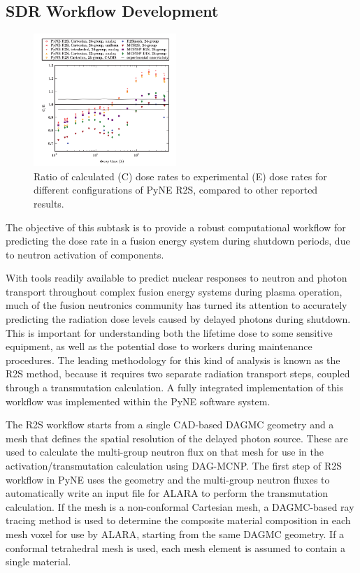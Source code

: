 \subsection{\gls{SDR} Workflow Development}

\begin{figure}
\centering
\includegraphics[width=0.48\textwidth]{imgs/r2s-validation.png}
\caption{\label{fig:r2s-validation}Ratio of calculated (C) dose rates to
  experimental (E) dose rates for different configurations of PyNE R2S,
  compared to other reported results.}
\end{figure}

The objective of this subtask is to provide a robust computational workflow
for predicting the dose rate in a fusion energy system during shutdown
periods, due to neutron activation of components.

With tools readily available to predict nuclear responses to neutron and
photon transport throughout complex fusion energy systems during plasma
operation, much of the fusion neutronics community has turned its attention to
accurately predicting the radiation dose levels caused by delayed photons
during shutdown.  This is important for understanding both the lifetime dose
to some sensitive equipment, as well as the potential dose to workers during
maintenance procedures.  The leading methodology for this kind of analysis is
known as the \gls{R2S} method, because it requires two separate radiation
transport steps, coupled through a transmutation
calculation.
A fully integrated implementation of this workflow was implemented within the
PyNE software system.

The \gls{R2S} workflow starts from a single CAD-based \gls{DAGMC} geometry and
a mesh that defines the spatial resolution of the delayed photon source.
These are used to calculate the multi-group neutron flux on that mesh for use
in the activation/transmutation calculation using DAG-MCNP.  The first step of
\gls{R2S} workflow in PyNE uses the geometry and the multi-group neutron
fluxes to automatically write an input file for
ALARA to perform the transmutation calculation.
If the mesh is a non-conformal Cartesian mesh, a \gls{DAGMC}-based ray tracing
method is used to determine the composite material composition in each mesh
voxel for use by ALARA, starting from the same \gls{DAGMC} geometry.  If a
conformal tetrahedral mesh is used, each mesh element is assumed to contain a
single material.

